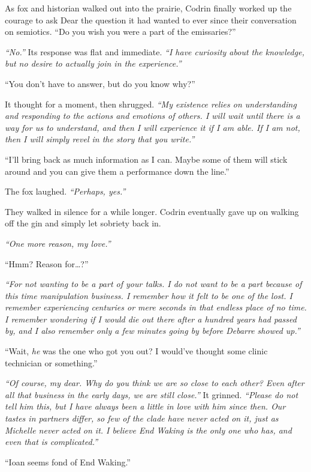 As fox and historian walked out into the prairie, Codrin finally worked up the courage to ask Dear the question it had wanted to ever since their conversation on semiotics. ``Do you wish you were a part of the emissaries?''

\emph{``No.''} Its response was flat and immediate. \emph{``I have curiosity about the knowledge, but no desire to actually join in the experience.''}

``You don't have to answer, but do you know why?''

It thought for a moment, then shrugged. \emph{``My existence relies on understanding and responding to the actions and emotions of others. I will wait until there is a way for us to understand, and then I will experience it if I am able. If I am not, then I will simply revel in the story that you write.''}

``I'll bring back as much information as I can. Maybe some of them will stick around and you can give them a performance down the line.''

The fox laughed. \emph{``Perhaps, yes.''}

They walked in silence for a while longer. Codrin eventually gave up on walking off the gin and simply let sobriety back in.

\emph{``One more reason, my love.''}

``Hmm? Reason for\ldots?''

\emph{``For not wanting to be a part of your talks. I do not want to be a part because of this time manipulation business. I remember how it felt to be one of the lost. I remember experiencing centuries or mere seconds in that endless place of no time. I remember wondering if I would die out there after a hundred years had passed by, and I also remember only a few minutes going by before Debarre showed up.''}

``Wait, \emph{he} was the one who got you out? I would've thought some clinic technician or something.''

\emph{``Of course, my dear. Why do you think we are so close to each other? Even after all that business in the early days, we are still close.''} It grinned. \emph{``Please do not tell him this, but I have always been a little in love with him since then. Our tastes in partners differ, so few of the clade have never acted on it, just as Michelle never acted on it.  I believe End Waking is the only one who has, and even that is complicated.''}

``Ioan seems fond of End Waking.''

